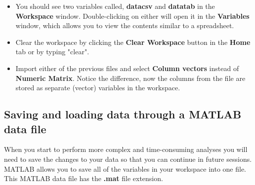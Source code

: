 \documentclass[12pt,a4paper]{article}
\begin{document}
\begin{enumerate}
\begin{itemize}
		\item You should see two variables called, \textbf{datacsv} and \textbf{datatab} in the \textbf{Workspace} window. Double-clicking on either will open it in the \textbf{Variables} window, which allows you to view the contents similar to a spreadsheet.
		\item Clear the workspace by clicking the \textbf{Clear Workspace} button in the \textbf{Home} tab or by typing "clear".
		\item Import either of the previous files and select \textbf{Column vectors} instead of \textbf{Numeric Matrix}. Notice the difference, now the columns from the file are stored as separate (vector) variables in the workspace.
	\end{itemize}
\end{enumerate}

\subsection{Saving and loading data through a MATLAB data file}
When you start to perform more complex and time-consuming analyses you will need to save the changes to your data so that you can continue in future sessions.  
MATLAB allows you to save all of the variables in your workspace into one file.  
This MATLAB data file has the \textbf{.mat} file extension.

\end{document}

